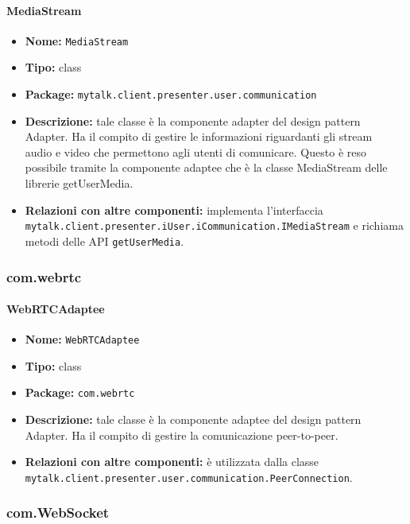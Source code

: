 \paragraph{MediaStream}{
	\begin{itemize}
		\item [] \textbf{Nome:} \texttt{MediaStream}
		\item [] \textbf{Tipo:} class
		\item [] \textbf{Package:} \texttt{mytalk.client.presenter.user.communication}
		\item [] \textbf{Descrizione: }tale classe è la componente adapter del design pattern Adapter. Ha il compito di gestire le informazioni riguardanti gli stream\g~ audio e video che permettono agli utenti di comunicare. Questo è reso possibile tramite la componente adaptee che è la classe MediaStream delle librerie getUserMedia\g.
		\item [] \textbf{Relazioni con altre componenti:} implementa l'interfaccia\\ \texttt{mytalk.client.presenter.iUser.iCommunication.IMediaStream} e richiama metodi delle API \texttt{getUserMedia}.
	\end{itemize}
}

\subsubsection{com.webrtc}
\paragraph{WebRTCAdaptee}{
	\begin{itemize}
		\item [] \textbf{Nome:} \texttt{WebRTCAdaptee}
		\item [] \textbf{Tipo:} class
		\item [] \textbf{Package:} \texttt{com.webrtc}
		\item [] \textbf{Descrizione:} tale classe è la componente adaptee del design pattern Adapter. Ha il compito di gestire la comunicazione peer-to-peer\g. 
		\item [] \textbf{Relazioni con altre componenti:} è utilizzata dalla classe\\ \texttt{mytalk.client.presenter.user.communication.PeerConnection}.
	\end{itemize}
}

\subsubsection{com.WebSocket}

